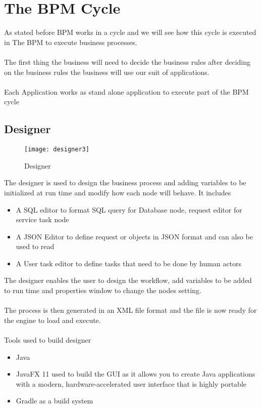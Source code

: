 \section{The BPM Cycle}

As stated before BPM works in a cycle and we will see how this cycle is executed in The BPM to execute business processes.
\\\\
The first thing the business will need to decide the business rules after deciding on the business rules the business will use our suit of applications.\\\\
Each Application works as stand alone application to execute part of the BPM cycle

\subsection{Designer}
\begin{figure}[h]
    \texttt{[image: designer3]}
    \centering
    \caption{Designer}
    \label{fig:designer}
\end{figure}

The designer is used to design the business process and adding variables to be initialized at run time
and modify how each node will behave.
It includes

\begin{itemize}
    \item A SQL editor to format SQL query for Database node, request editor for service task node
    \item A JSON Editor to define request or objects in JSON format and can also be used to read
    \item A User task editor to define tasks that need to be done by human actors
\end{itemize}

The designer enables the user to design the workflow, add variables to be added to run time and
properties window to change the nodes setting.\\\\
The process is then generated in an XML file format and the file is now ready for the engine to load
and execute.\\\\
Tools used to build designer
\begin{itemize}
    \item Java
    \item JavaFX 11 used to build the GUI as it allows you to create Java applications with a
    modern, hardware-accelerated user interface that is highly portable
    \item Gradle as a build system
\end{itemize}

